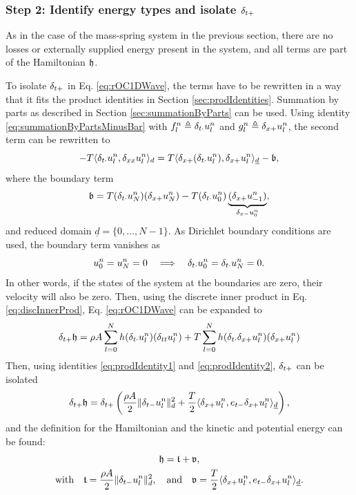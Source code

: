 {{\subsubsection{Step 2: Identify energy types and isolate $\delta_{t+}$}
As in the case of the mass-spring system in the previous section, there are no losses or externally supplied energy present in the system, and all terms are part of the Hamiltonian $\mathfrak{h}$.

To isolate $\delta_{t+}$ in Eq. \eqref{eq:rOC1DWave}, the terms have to be rewritten in a way that it fits the product identities in Section \ref{sec:prodIdentities}.
Summation by parts as described in Section \ref{sec:summationByParts}  can be used. Using identity \eqref{eq:summationByPartsMinusBar}  with $f_l^n \triangleq \delta_{t\cdot} u_l^n$ and $g_l^n \triangleq \delta_{x+} u_l^n$, the second term can be rewritten to 
%
\begin{equation*}
    - T \langle \delta_{t\cdot}u_l^n, \delta_{xx} u_l^n\rangle_d  = T\langle \delta_{x+}(\delta_{t\cdot}u_l^n), \delta_{x+}u_l^n\rangle_{\underline{d}} - \mathfrak{b},
\end{equation*}
where the boundary term
\begin{equation*}
    \mathfrak{b} = T(\delta_{t\cdot} u_N^n)(\delta_{x+} u_N^n) - T(\delta_{t\cdot} u_0^n) \underbrace{(\delta_{x+} u_{-1}^n)}_{\delta_{x-} u_0^n},
\end{equation*}
and reduced domain $\underline{d} = \{0, \hdots, N-1\}$. As Dirichlet boundary conditions are used, the boundary term vanishes as 
\begin{equation*}
    u_0^n = u_N^n = 0 \quad \Longrightarrow \quad \delta_{t\cdot} u_0^n = \delta_{t\cdot} u_N^n = 0.
\end{equation*}
In other words, if the states of the system at the boundaries are zero, their velocity will also be zero. 
Then, using the discrete inner product in Eq. \eqref{eq:discInnerProd}, Eq. \eqref{eq:rOC1DWave} can be expanded to
\begin{equation}
    \delta_{t+} \mathfrak{h} = \rho A \sum_{l = 0}^N h(\delta_{t\cdot} u_l^n)(\delta_{tt} u_l^n) + T \sum_{l = 0}^N h(\delta_{t\cdot} \delta_{x+} u_l^n)(\delta_{x+} u_l^n)
\end{equation}
Then, using identities \eqref{eq:prodIdentity1} and \eqref{eq:prodIdentity2}, $\delta_{t+}$ can be isolated 
\begin{equation}
    \delta_{t+} \mathfrak{h} = \delta_{t+} \left(\frac{\rho A}{2}\lVert\delta_{t-} u_l^n\rVert^2_d + \frac{T}{2}\langle\delta_{x+}u_l^n, e_{t-}\delta_{x+}u_l^n\rangle_{\underline{d}}\right),
\end{equation}
and the definition for the Hamiltonian and the kinetic and potential energy can be found:
\begin{equation}\label{eq:energyBalance1DWave}
    \begin{gathered}
        \mathfrak{h} = \mathfrak{t} + \mathfrak{v},\\
        \text{with}\quad \mathfrak{t} = \frac{\rho A}{2}\lVert\delta_{t-} u_l^n\rVert^2_d, \quad \text{and} \quad \mathfrak{v} = \frac{T}{2}\langle\delta_{x+}u_l^n, e_{t-}\delta_{x+}u_l^n\rangle_{\underline{d}}.
    \end{gathered}
\end{equation}

}}
